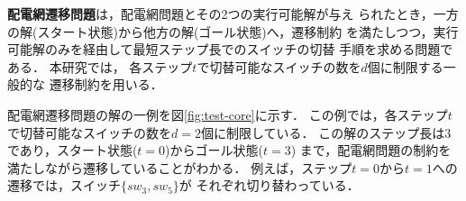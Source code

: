 \textbf{配電網遷移問題}は，配電網問題とその2つの実行可能解が与え
られたとき，一方の解(スタート状態)から他方の解(ゴール状態)へ，遷移制約
を満たしつつ，実行可能解のみを経由して最短ステップ長でのスイッチの切替
手順を求める問題である．
本研究では，
各ステップ$t$で切替可能なスイッチの数を$d$個に制限する一般的な
遷移制約を用いる．

配電網遷移問題の解の一例を図\ref{fig:test-core}に示す．
この例では，各ステップ$t$で切替可能なスイッチの数を$d=2$個に制限している．
この解のステップ長は3であり，スタート状態($t=0$)からゴール状態($t=3$)
まで，配電網問題の制約を満たしながら遷移していることがわかる．
例えば，ステップ$t=0$から$t=1$への遷移では，スイッチ$\{sw_3,sw_5\}$が
それぞれ切り替わっている．




